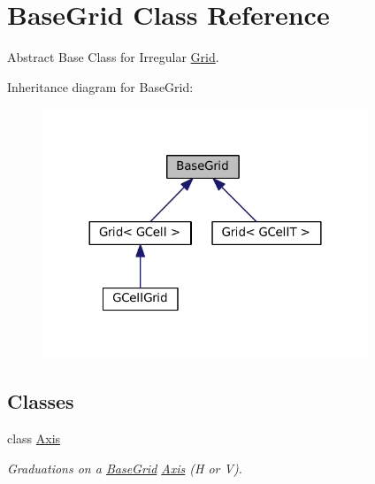 \hypertarget{classKatabatic_1_1BaseGrid}{}\section{Base\+Grid Class Reference}
\label{classKatabatic_1_1BaseGrid}


Abstract Base Class for Irregular \mbox{\hyperlink{classKatabatic_1_1Grid}{Grid}}.  




Inheritance diagram for Base\+Grid\+:\nopagebreak
\begin{figure}[H]
\begin{center}
\leavevmode
\includegraphics[width=276pt]{classKatabatic_1_1BaseGrid__inherit__graph}
\end{center}
\end{figure}
\subsection*{Classes}
\begin{DoxyCompactItemize}
\item 
class \mbox{\hyperlink{classKatabatic_1_1BaseGrid_1_1Axis}{Axis}}
\begin{DoxyCompactList}\small\item\em Graduations on a \mbox{\hyperlink{classKatabatic_1_1BaseGrid}{Base\+Grid}} \mbox{\hyperlink{classKatabatic_1_1BaseGrid_1_1Axis}{Axis}} (H or V). \end{DoxyCompactList}\end{DoxyCompactItemize}
